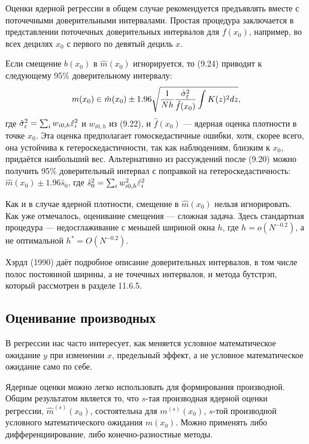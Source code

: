Оценки ядерной регрессии в общем случае рекомендуется предъявлять вместе с поточечными доверительными интервалами. Простая процедура заключается в представлении поточечных доверительных интервалов для $f(x_0)$, например, во всех децилях $x_0$ с первого по девятый дециль $x$.

Если смещение $b(x_0)$ в $\hat{m}(x_0)$ игнорируется, то (9.24) приводит к следующему 95\% доверительному интервалу:
\[
m(x_0) \in \hat{m}(x_0) \pm 1.96 \sqrt{\frac{1}{Nh} \frac{\hat{\sigma}_{\varepsilon}^2}{\hat{f}(x_0)} \int K(z)^2dz},
\]
где $\hat{\sigma}_{\varepsilon}^2 = \sum_i w_{i0,h} \hat{\varepsilon}_i^2$ и $ w_{i0,h}$ из (9.22), и $\hat{f}(x_0)$ --- ядерная оценка плотности в точке $x_0$. Эта оценка предполагает гомоскедастичные ошибки, хотя, скорее всего, она устойчива к гетероскедастичности, так как наблюдениям, близким к $x_0$, придаётся наибольший вес. Альтернативно из рассуждений  после (9.20) можно получить 95\% доверительный интервал с поправкой на гетероскедастичность: $\hat{m}(x_0) \pm 1.96\hat{s}_0$, где $\hat{s}_0^2 = \sum_i w_{i0,h}^2 \hat{\varepsilon}_i^2$

Как и в случае ядерной плотности, смещение в $\hat{m}(x_0)$ нельзя игнорировать. Как уже отмечалось, оценивание смещения --- сложная задача. Здесь стандартная процедура --- недосглаживание с меньшей шириной окна $h$, где $h = o(N^{-0.2})$, а не оптимальной $h^* = O(N^{-0.2})$.

Хэрдл (1990) даёт подробное описание доверительных интервалов, в том числе полос постоянной ширины, а не точечных интервалов, и метода бутстрэп, который рассмотрен в разделе 11.6.5.

\subsection{Оценивание производных}

В регрессии нас часто интересует, как меняется условное математическое ожидание $y$ при изменении $x$, предельный эффект, а не условное математическое ожидание само по себе.

Ядерные оценки можно легко использовать для формирования производной. Общим результатом является то, что $s$-тая
производная ядерной оценки регрессии, $\hat{m}^{(s)}(x_0)$, состоятельна для $m^{(s)}(x_0)$, $s$-той производной условного математического ожидания $m(x_0)$. Можно применять либо дифференциирование, либо конечно-разностные методы.

